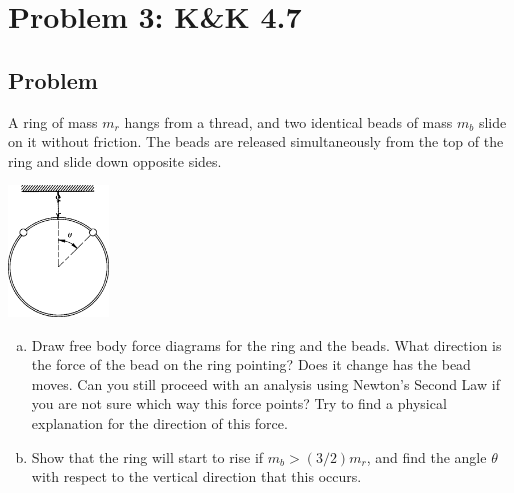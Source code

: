 \documentclass[solutions]{esg8012pset}
\begin{document}
\section*{Problem 3: K\&K 4.7}
\subsection*{Problem}
  A ring of mass $m_r$ hangs from a thread, and two identical beads of mass $m_b$ slide on it without friction. The beads are released simultaneously from the top of the ring and slide down opposite sides.
  \begin{center}\includegraphics[width=0.2\textwidth]{ps06_2}\end{center}
  \begin{enumerate}[(a)]
  \item Draw free body force diagrams for the ring and the beads. What direction is the force of the bead on the ring pointing? Does it change has the bead moves. Can you still proceed with an analysis using Newton's Second Law if you are not sure which way this force points? Try to find a physical explanation for the direction of this force.
    \item Show that the ring will start to rise if $m_b > (3/2)m_r$, and find the angle $\theta$ with respect to the vertical direction that this occurs.
  \end{enumerate}
\end{document}
